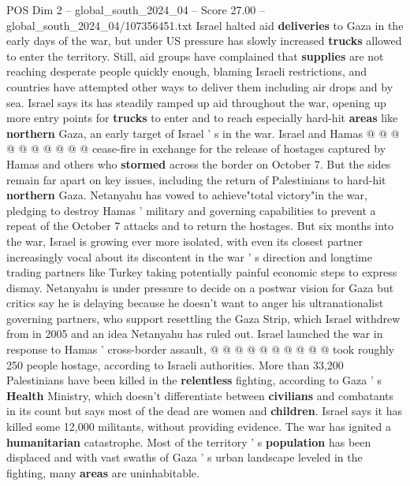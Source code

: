 \begin{textsample}{POS Dim 2 – global\_south\_2024\_04 – Score 27.00 – global\_south\_2024\_04/107356451.txt}
Israel halted aid \textbf{deliveries} to Gaza in the early days of the war, but under US pressure has slowly increased \textbf{trucks} allowed to enter the territory.
Still, aid groups have complained that \textbf{supplies} are not reaching desperate people quickly enough, blaming Israeli restrictions, and countries have attempted other ways to deliver them including air drops and by sea.
Israel says its has steadily ramped up aid throughout the war, opening up more entry points for \textbf{trucks} to enter and to reach especially hard-hit \textbf{areas} like \textbf{northern} Gaza, an early target of Israel ' s in the war.
Israel and Hamas @ @ @ @ @ @ @ @ @ @ cease-fire in exchange for the release of hostages captured by Hamas and others who \textbf{stormed} across the border on October 7.
But the sides remain far apart on key issues, including the return of Palestinians to hard-hit \textbf{northern} Gaza.
Netanyahu has vowed to achieve"total victory"in the war, pledging to destroy Hamas ' military and governing capabilities to prevent a repeat of the October 7 attacks and to return the hostages.
But six months into the war, Israel is growing ever more isolated, with even its closest partner increasingly vocal about its discontent in the war ' s direction and longtime trading partners like Turkey taking potentially painful economic steps to express dismay.
Netanyahu is under pressure to decide on a postwar vision for Gaza but critics say he is delaying because he doesn't want to anger his ultranationalist governing partners, who support resettling the Gaza Strip, which Israel withdrew from in 2005 and an idea Netanyahu has ruled out.
Israel launched the war in response to Hamas ' cross-border assault, @ @ @ @ @ @ @ @ @ @ took roughly 250 people hostage, according to Israeli authorities.
More than 33,200 Palestinians have been killed in the \textbf{relentless} fighting, according to Gaza ' s \textbf{Health} Ministry, which doesn't differentiate between \textbf{civilians} and combatants in its count but says most of the dead are women and \textbf{children}.
Israel says it has killed some 12,000 militants, without providing evidence.
The war has ignited a \textbf{humanitarian} catastrophe.
Most of the territory ' s \textbf{population} has been displaced and with vast swaths of Gaza ' s urban landscape leveled in the fighting, many \textbf{areas} are uninhabitable.

\end{textsample}
